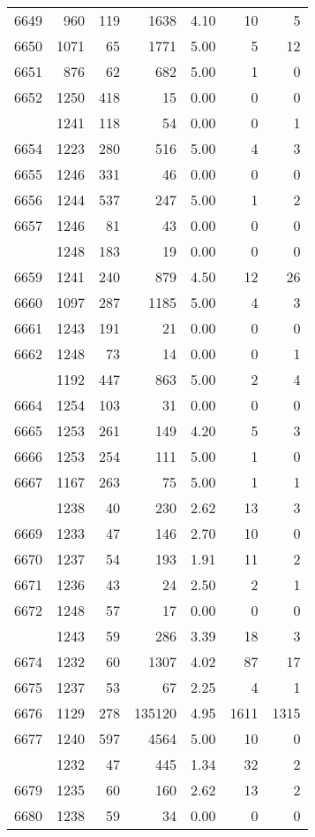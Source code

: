\documentclass[
]{article}
\begin{document}
\begin{table}
\begin{tabular}[t]{lrrrrrr}
6649 & 960 & 119 & 1638 & 4.10 & 10 & 5\\
6650 & 1071 & 65 & 1771 & 5.00 & 5 & 12\\
6651 & 876 & 62 & 682 & 5.00 & 1 & 0\\
6652 & 1250 & 418 & 15 & 0.00 & 0 & 0\\
\addlinespace
6653 & 1241 & 118 & 54 & 0.00 & 0 & 1\\
6654 & 1223 & 280 & 516 & 5.00 & 4 & 3\\
6655 & 1246 & 331 & 46 & 0.00 & 0 & 0\\
6656 & 1244 & 537 & 247 & 5.00 & 1 & 2\\
6657 & 1246 & 81 & 43 & 0.00 & 0 & 0\\
\addlinespace
6658 & 1248 & 183 & 19 & 0.00 & 0 & 0\\
6659 & 1241 & 240 & 879 & 4.50 & 12 & 26\\
6660 & 1097 & 287 & 1185 & 5.00 & 4 & 3\\
6661 & 1243 & 191 & 21 & 0.00 & 0 & 0\\
6662 & 1248 & 73 & 14 & 0.00 & 0 & 1\\
\addlinespace
6663 & 1192 & 447 & 863 & 5.00 & 2 & 4\\
6664 & 1254 & 103 & 31 & 0.00 & 0 & 0\\
6665 & 1253 & 261 & 149 & 4.20 & 5 & 3\\
6666 & 1253 & 254 & 111 & 5.00 & 1 & 0\\
6667 & 1167 & 263 & 75 & 5.00 & 1 & 1\\
\addlinespace
6668 & 1238 & 40 & 230 & 2.62 & 13 & 3\\
6669 & 1233 & 47 & 146 & 2.70 & 10 & 0\\
6670 & 1237 & 54 & 193 & 1.91 & 11 & 2\\
6671 & 1236 & 43 & 24 & 2.50 & 2 & 1\\
6672 & 1248 & 57 & 17 & 0.00 & 0 & 0\\
\addlinespace
6673 & 1243 & 59 & 286 & 3.39 & 18 & 3\\
6674 & 1232 & 60 & 1307 & 4.02 & 87 & 17\\
6675 & 1237 & 53 & 67 & 2.25 & 4 & 1\\
6676 & 1129 & 278 & 135120 & 4.95 & 1611 & 1315\\
6677 & 1240 & 597 & 4564 & 5.00 & 10 & 0\\
\addlinespace
6678 & 1232 & 47 & 445 & 1.34 & 32 & 2\\
6679 & 1235 & 60 & 160 & 2.62 & 13 & 2\\
6680 & 1238 & 59 & 34 & 0.00 & 0 & 0\\

\end{tabular}
\end{table}
\end{document}
